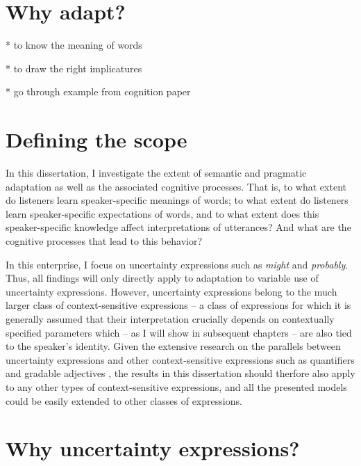 \section{Why adapt?}

* to know the meaning of words

* to draw the right implicatures

* go through example from cognition paper

\section{Defining the scope}

In this dissertation, I investigate the extent of semantic and pragmatic adaptation as well as
the associated cognitive processes. That is, to what extent do listeners learn speaker-specific
meanings of words; to what extent do listeners learn speaker-specific expectations of words,
and to what extent does this speaker-specific knowledge affect interpretations of utterances? 
And what are the cognitive processes that lead to this behavior?

In this enterprise, I focus on uncertainty expressions
such as \emph{might} and \emph{probably}. Thus, all findings will only directly apply to 
adaptation to variable use of uncertainty expressions. However, uncertainty expressions 
belong to the much larger class of context-sensitive expressions -- a class of expressions for 
which it is generally assumed  that their interpretation crucially depends on contextually 
specified parameters which -- as I will show in subsequent chapters --
are also tied to the speaker's identity. Given the extensive research on the parallels between
uncertainty expressions and other context-sensitive expressions such as quantifiers and
gradable adjectives \cite{LassiterBook, SchoellerFranke?}, the results in this dissertation
should therfore also apply to any other types of context-sensitive expressions, and all
the presented models could be easily extended to other classes of expressions. 

\section{Why uncertainty expressions?}

